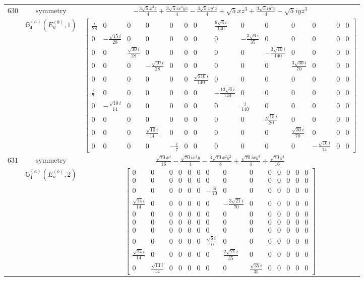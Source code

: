 \documentclass[fleqn,8pt,landscape]{jsarticle}
\begin{document}
\begin{longtable}{ccc}
$ 630 $ & $ \text{symmetry} $ & $ - \frac{3 \sqrt{5} x^{3} z}{4} + \frac{3 \sqrt{5} i x^{2} y z}{4} - \frac{3 \sqrt{5} x y^{2} z}{4} + \sqrt{5} x z^{3} + \frac{3 \sqrt{5} i y^{3} z}{4} - \sqrt{5} i y z^{3} $ \\
$  $ & $ \mathbb{G}_{4}^{(a)}(E_{u}^{(b)},1) $ & $ \begin{bmatrix} \frac{i}{28} & 0 & 0 & 0 & 0 & 0 & 0 & \frac{9 \sqrt{6} i}{140} & 0 & 0 & 0 & 0 & 0 & 0 \\ 0 & - \frac{\sqrt{15} i}{28} & 0 & 0 & 0 & 0 & 0 & 0 & - \frac{3 \sqrt{6} i}{35} & 0 & 0 & 0 & 0 & 0 \\ 0 & 0 & \frac{\sqrt{30} i}{28} & 0 & 0 & 0 & 0 & 0 & 0 & - \frac{3 \sqrt{10} i}{140} & 0 & 0 & 0 & 0 \\ 0 & 0 & 0 & - \frac{\sqrt{10} i}{28} & 0 & 0 & 0 & 0 & 0 & 0 & \frac{3 \sqrt{30} i}{70} & 0 & 0 & 0 \\ 0 & 0 & 0 & 0 & 0 & 0 & \frac{\sqrt{210} i}{140} & 0 & 0 & 0 & 0 & 0 & 0 & 0 \\ \frac{i}{7} & 0 & 0 & 0 & 0 & 0 & 0 & - \frac{13 \sqrt{6} i}{140} & 0 & 0 & 0 & 0 & 0 & 0 \\ 0 & - \frac{\sqrt{10} i}{14} & 0 & 0 & 0 & 0 & 0 & 0 & \frac{i}{140} & 0 & 0 & 0 & 0 & 0 \\ 0 & 0 & 0 & 0 & 0 & 0 & 0 & 0 & 0 & \frac{\sqrt{15} i}{20} & 0 & 0 & 0 & 0 \\ 0 & 0 & 0 & \frac{\sqrt{10} i}{14} & 0 & 0 & 0 & 0 & 0 & 0 & \frac{\sqrt{30} i}{70} & 0 & 0 & 0 \\ 0 & 0 & 0 & 0 & - \frac{i}{7} & 0 & 0 & 0 & 0 & 0 & 0 & - \frac{\sqrt{10} i}{14} & 0 & 0 \end{bmatrix} $ \\ \hline
$ 631 $ & $ \text{symmetry} $ & $ \frac{\sqrt{70} x^{4}}{16} - \frac{\sqrt{70} i x^{3} y}{4} - \frac{3 \sqrt{70} x^{2} y^{2}}{8} + \frac{\sqrt{70} i x y^{3}}{4} + \frac{\sqrt{70} y^{4}}{16} $ \\
$  $ & $ \mathbb{G}_{4}^{(a)}(E_{u}^{(b)},2) $ & $ \begin{bmatrix} 0 & 0 & 0 & 0 & 0 & 0 & 0 & 0 & 0 & 0 & 0 & 0 & 0 & 0 \\ 0 & 0 & 0 & 0 & 0 & 0 & 0 & 0 & 0 & 0 & 0 & 0 & 0 & 0 \\ 0 & 0 & 0 & 0 & 0 & 0 & - \frac{3 i}{10} & 0 & 0 & 0 & 0 & 0 & 0 & 0 \\ \frac{\sqrt{14} i}{14} & 0 & 0 & 0 & 0 & 0 & 0 & - \frac{3 \sqrt{21} i}{70} & 0 & 0 & 0 & 0 & 0 & 0 \\ 0 & 0 & 0 & 0 & 0 & 0 & 0 & 0 & 0 & 0 & 0 & 0 & 0 & 0 \\ 0 & 0 & 0 & 0 & 0 & 0 & 0 & 0 & 0 & 0 & 0 & 0 & 0 & 0 \\ 0 & 0 & 0 & 0 & 0 & 0 & 0 & 0 & 0 & 0 & 0 & 0 & 0 & 0 \\ 0 & 0 & 0 & 0 & 0 & 0 & \frac{\sqrt{6} i}{10} & 0 & 0 & 0 & 0 & 0 & 0 & 0 \\ \frac{\sqrt{14} i}{14} & 0 & 0 & 0 & 0 & 0 & 0 & \frac{2 \sqrt{21} i}{35} & 0 & 0 & 0 & 0 & 0 & 0 \\ 0 & \frac{\sqrt{14} i}{14} & 0 & 0 & 0 & 0 & 0 & 0 & \frac{\sqrt{35} i}{35} & 0 & 0 & 0 & 0 & 0 \end{bmatrix} $ \\ \hline

\end{longtable}
\end{document}
